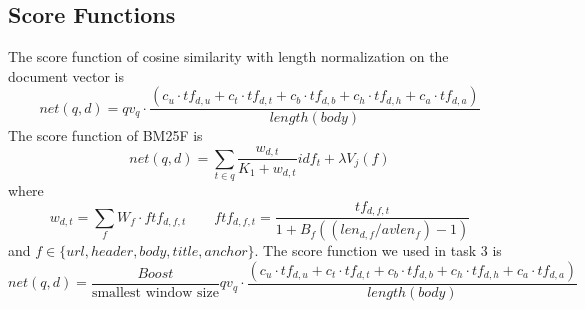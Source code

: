 \subsection{Score Functions}
The score function of cosine similarity with length normalization on the document vector is
\begin{equation}\label{eq:1}
net(q, d) = qv_q \cdot \frac{(c_u \cdot tf_{d, u} + c_t \cdot tf_{d, t} + c_b \cdot tf_{d, b} + c_h \cdot tf_{d, h}
+ c_a \cdot tf_{d, a})}{length(body)}
\end{equation}
The score function of BM25F is
\begin{equation}\label{eq:2}
net(q, d) = \sum_{t \in q} \frac{w_{d,t}}{K_1 + w_{d,t}} idf_t + \lambda V_j (f)
\end{equation}
where
\begin{equation}\label{eq:3}
w_{d,t} = \sum_{f} W_f \cdot ftf_{d, f, t} \qquad
ftf_{d, f, t} = \frac{tf_{d, f, t}}{1 + B_f((len_{d,f}/avlen_f)-1)}
\end{equation}
and $f \in \{url, header, body, title, anchor \}$.
The score function we used in task $3$ is
\begin{equation}\label{eq:4}
net(q, d) = \frac{Boost}{\textrm{smallest window size}}
qv_q \cdot \frac{(c_u \cdot tf_{d, u} + c_t \cdot tf_{d, t} + c_b \cdot tf_{d, b} + c_h \cdot tf_{d, h}
+ c_a \cdot tf_{d, a})}{length(body)}
\end{equation}



